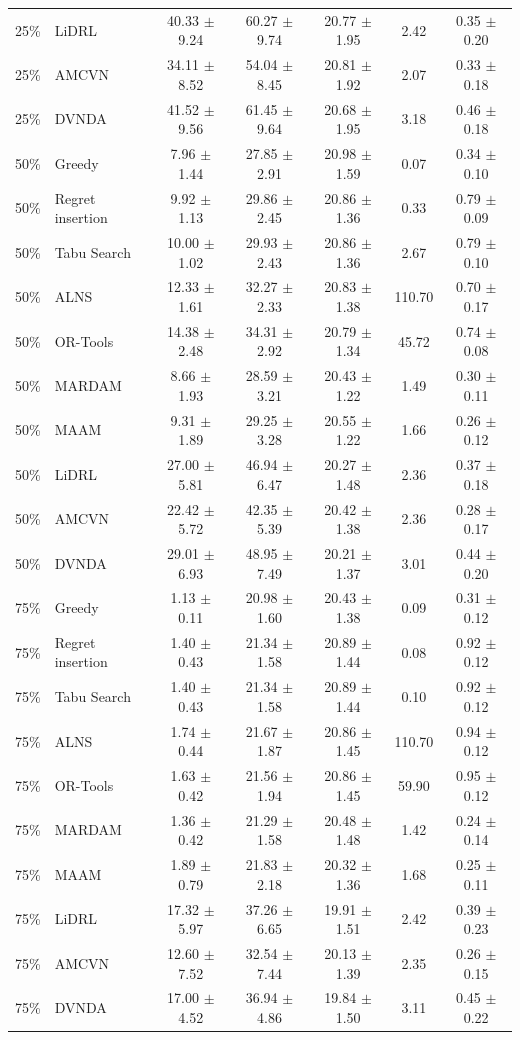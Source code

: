 \begin{tabular}{clccccc}
25\% & LiDRL & 40.33 $\pm$ 9.24 & 60.27 $\pm$ 9.74 & 20.77 $\pm$ 1.95 & 2.42 & 0.35 $\pm$ 0.20 \\
25\% & AMCVN & 34.11 $\pm$ 8.52 & 54.04 $\pm$ 8.45 & 20.81 $\pm$ 1.92 & 2.07 & 0.33 $\pm$ 0.18 \\
25\% & DVNDA & 41.52 $\pm$ 9.56 & 61.45 $\pm$ 9.64 & 20.68 $\pm$ 1.95 & 3.18 & 0.46 $\pm$ 0.18 \\
50\% & Greedy & 7.96 $\pm$ 1.44 & 27.85 $\pm$ 2.91 & 20.98 $\pm$ 1.59 & 0.07 & 0.34 $\pm$ 0.10 \\
50\% & Regret insertion & 9.92 $\pm$ 1.13 & 29.86 $\pm$ 2.45 & 20.86 $\pm$ 1.36 & 0.33 & 0.79 $\pm$ 0.09 \\
50\% & Tabu Search & 10.00 $\pm$ 1.02 & 29.93 $\pm$ 2.43 & 20.86 $\pm$ 1.36 & 2.67 & 0.79 $\pm$ 0.10 \\
50\% & ALNS & 12.33 $\pm$ 1.61 & 32.27 $\pm$ 2.33 & 20.83 $\pm$ 1.38 & 110.70 & 0.70 $\pm$ 0.17 \\
50\% & OR-Tools & 14.38 $\pm$ 2.48 & 34.31 $\pm$ 2.92 & 20.79 $\pm$ 1.34 & 45.72 & 0.74 $\pm$ 0.08 \\
50\% & MARDAM & 8.66 $\pm$ 1.93 & 28.59 $\pm$ 3.21 & 20.43 $\pm$ 1.22 & 1.49 & 0.30 $\pm$ 0.11 \\
50\% & MAAM & 9.31 $\pm$ 1.89 & 29.25 $\pm$ 3.28 & 20.55 $\pm$ 1.22 & 1.66 & 0.26 $\pm$ 0.12 \\
50\% & LiDRL & 27.00 $\pm$ 5.81 & 46.94 $\pm$ 6.47 & 20.27 $\pm$ 1.48 & 2.36 & 0.37 $\pm$ 0.18 \\
50\% & AMCVN & 22.42 $\pm$ 5.72 & 42.35 $\pm$ 5.39 & 20.42 $\pm$ 1.38 & 2.36 & 0.28 $\pm$ 0.17 \\
50\% & DVNDA & 29.01 $\pm$ 6.93 & 48.95 $\pm$ 7.49 & 20.21 $\pm$ 1.37 & 3.01 & 0.44 $\pm$ 0.20 \\
75\% & Greedy & 1.13 $\pm$ 0.11 & 20.98 $\pm$ 1.60 & 20.43 $\pm$ 1.38 & 0.09 & 0.31 $\pm$ 0.12 \\
75\% & Regret insertion & 1.40 $\pm$ 0.43 & 21.34 $\pm$ 1.58 & 20.89 $\pm$ 1.44 & 0.08 & 0.92 $\pm$ 0.12 \\
75\% & Tabu Search & 1.40 $\pm$ 0.43 & 21.34 $\pm$ 1.58 & 20.89 $\pm$ 1.44 & 0.10 & 0.92 $\pm$ 0.12 \\
75\% & ALNS & 1.74 $\pm$ 0.44 & 21.67 $\pm$ 1.87 & 20.86 $\pm$ 1.45 & 110.70 & 0.94 $\pm$ 0.12 \\
75\% & OR-Tools & 1.63 $\pm$ 0.42 & 21.56 $\pm$ 1.94 & 20.86 $\pm$ 1.45 & 59.90 & 0.95 $\pm$ 0.12 \\
75\% & MARDAM & 1.36 $\pm$ 0.42 & 21.29 $\pm$ 1.58 & 20.48 $\pm$ 1.48 & 1.42 & 0.24 $\pm$ 0.14 \\
75\% & MAAM & 1.89 $\pm$ 0.79 & 21.83 $\pm$ 2.18 & 20.32 $\pm$ 1.36 & 1.68 & 0.25 $\pm$ 0.11 \\
75\% & LiDRL & 17.32 $\pm$ 5.97 & 37.26 $\pm$ 6.65 & 19.91 $\pm$ 1.51 & 2.42 & 0.39 $\pm$ 0.23 \\
75\% & AMCVN & 12.60 $\pm$ 7.52 & 32.54 $\pm$ 7.44 & 20.13 $\pm$ 1.39 & 2.35 & 0.26 $\pm$ 0.15 \\
75\% & DVNDA & 17.00 $\pm$ 4.52 & 36.94 $\pm$ 4.86 & 19.84 $\pm$ 1.50 & 3.11 & 0.45 $\pm$ 0.22 \\
\bottomrule
\end{tabular}
